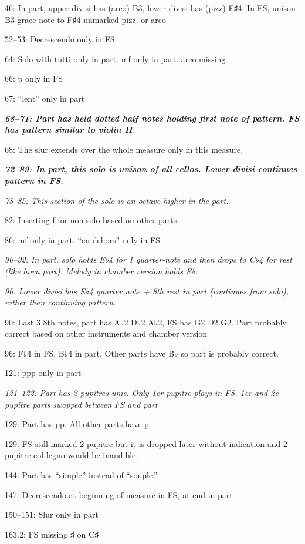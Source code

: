 \documentclass[twoside]{article}
\begin{document}
\begin{hangparas}{15pt}{1}
\begin{multicols}{2}
46: In part, upper divisi has (arco) B3, lower divisi has (pizz) F♯4. In FS, unison B3 grace note to F♯4 unmarked pizz. or arco

52--53: Decrescendo only in FS

64: Solo with tutti only in part. mf only in part. arco missing

66: p only in FS

67: ``lent'' only in part

\textbf{\textit{68--71: Part has held dotted half notes holding first note of pattern. FS has pattern similar to violin II.}}

68: The slur extends over the whole measure only in this measure.

\textbf{\textit{72--89: In part, this solo is unison of all cellos. Lower divisi continues pattern in FS.}}

\textit{78--85: This section of the solo is an octave higher in the part.}

82: Inserting f for non-solo based on other parts

86: mf only in part. ``en dehors'' only in FS

\textit{90--92: In part, solo holds E♭4 for 1 quarter-note and then drops to C♭4 for rest (like horn part). Melody in chamber version holds E♭.}

\textit{90: Lower divisi has E♭4 quarter note + 8th rest in part (continues from solo), rather than continuing pattern.}

90: Last 3 8th notes, part has A♭2 D♭2 A♭2, FS has G2 D2 G2. Part probably correct based on other instruments and chamber version

96: F♭4 in FS, B♭4 in part. Other parts have B♭ so part is probably correct. 

121: ppp only in part

\textit{121--122: Part has 2 pupitres unis. Only 1er pupitre plays in FS. 1er and 2e pupitre parts swapped between FS and part}

129: Part has pp. All other parts have p.

129: FS still marked 2 pupitre but it is dropped later without indication and 2--pupitre col legno would be inaudible.

144: Part has ``simple'' instead of ``souple.''

147: Decrescendo at beginning of measure in FS, at end in part

150--151: Slur only in part

163.2: FS missing ♯ on C♯


\end{multicols}
\end{hangparas}
\end{document}
